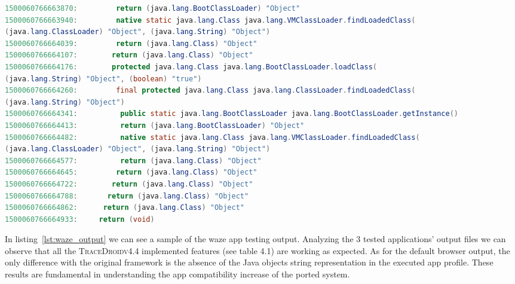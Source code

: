 \begin{listing}[!h]
\begin{adjustwidth}{-9em}{-9em}
\begin{lstlisting}[language=Java]
1500060766663870:         return (java.lang.BootClassLoader) "Object"
1500060766663940:         native static java.lang.Class java.lang.VMClassLoader.findLoadedClass(
(java.lang.ClassLoader) "Object", (java.lang.String) "Object")
1500060766664039:         return (java.lang.Class) "Object"
1500060766664107:        return (java.lang.Class) "Object"
1500060766664176:        protected java.lang.Class java.lang.BootClassLoader.loadClass(
(java.lang.String) "Object", (boolean) "true")
1500060766664260:         final protected java.lang.Class java.lang.ClassLoader.findLoadedClass(
(java.lang.String) "Object")
1500060766664341:          public static java.lang.BootClassLoader java.lang.BootClassLoader.getInstance()
1500060766664413:          return (java.lang.BootClassLoader) "Object"
1500060766664482:          native static java.lang.Class java.lang.VMClassLoader.findLoadedClass(
(java.lang.ClassLoader) "Object", (java.lang.String) "Object")
1500060766664577:          return (java.lang.Class) "Object"
1500060766664645:         return (java.lang.Class) "Object"
1500060766664722:        return (java.lang.Class) "Object"
1500060766664788:       return (java.lang.Class) "Object"
1500060766664862:      return (java.lang.Class) "Object"
1500060766664933:     return (void)
    \end{lstlisting}
  \end{adjustwidth}
\end{listing}

In listing~\ref{lst:waze_output} we can see a sample of the waze app testing
output. Analyzing the 3 tested applications' output files we can
observe that all the \textsc{TraceDroidv4.4} implemented features (see table 4.1)
are working as expected. As for the default browser output, the only
difference with the original framework is the absence of the Java
objects string representation in the executed
app profile. These results are fundamental in understanding the app
compatibility increase of the ported system.


